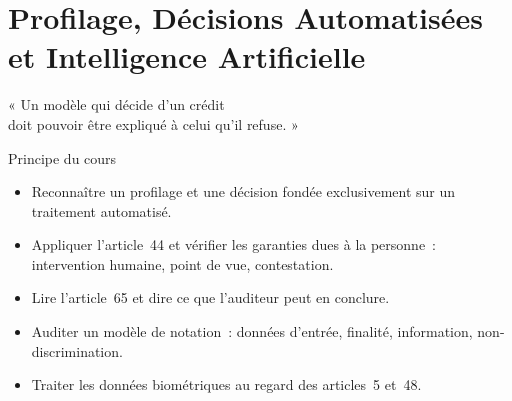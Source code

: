
\chapter{Profilage, Décisions Automatisées et Intelligence Artificielle}
\label{chap:profilage}

\epigraph{%
    « Un modèle qui décide d'un crédit\\
    doit pouvoir être expliqué à celui qu'il refuse. »%
}{Principe du cours}


\begin{boxobjectifs}
\begin{itemize}
    \item Reconnaître un profilage et une décision fondée exclusivement sur
          un traitement automatisé.
    \item Appliquer l'article~44 et vérifier les garanties dues à la
          personne~: intervention humaine, point de vue, contestation.
    \item Lire l'article~65 et dire ce que l'auditeur peut en conclure.
    \item Auditer un modèle de notation~: données d'entrée, finalité,
          information, non-discrimination.
    \item Traiter les données biométriques au regard des articles~5 et~48.
\end{itemize}
\end{boxobjectifs}

\bigskip


